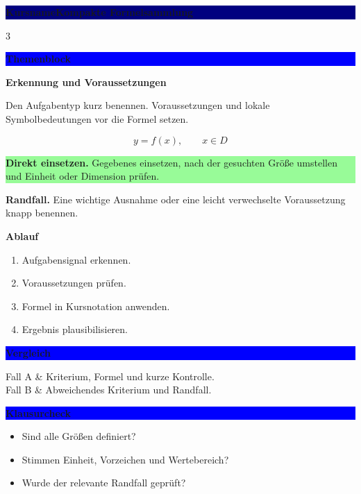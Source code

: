 \documentclass[10pt,a4paper]{article}
\makeatletter
\newcommand{\CourseName}{Kursname}
\newcommand{\SheetName}{Kompakte Formelsammlung}
\newcommand{\titlebar}{%
  \noindent\colorbox{Navy}{%
    \parbox{\dimexpr\linewidth-2\fboxsep\relax}{%
      \color{white}\bfseries\large \CourseName\hfill\normalsize \SheetName}}
  \vspace{2mm}}
\newcommand{\sect}[1]{%
  \vspace{1.5mm}\noindent\colorbox{Blue}{%
    \parbox{\dimexpr\linewidth-2\fboxsep\relax}{\color{white}\bfseries #1}}%
  \vspace{0.8mm}}
\newcommand{\subsect}[1]{\vspace{0.8mm}\textbf{\color{Navy}#1}\par}
\newcommand{\directbox}[1]{%
  \noindent\colorbox{PaleGreen}{%
    \parbox{\dimexpr\linewidth-2\fboxsep\relax}{%
      \textbf{\color{Green}Direkt einsetzen.} #1}}\par}
\newcommand{\warnbox}[1]{%
  \noindent\colorbox{PaleOrange}{%
    \parbox{\dimexpr\linewidth-2\fboxsep\relax}{%
      \textbf{\color{Orange}Randfall.} #1}}\par}
\newenvironment{cheattable}
  {\renewcommand{\arraystretch}{1.05}\tabularx{\linewidth}{@{}>{\raggedright\arraybackslash\bfseries}p{14mm}>{\raggedright\arraybackslash}X@{}}}
  {\endtabularx}
\makeatother
\begin{document}
\titlebar
\begin{multicols*}{3}

\sect{Themenblock}
\subsect{Erkennung und Voraussetzungen}
Den Aufgabentyp kurz benennen. Voraussetzungen und lokale Symbolbedeutungen vor die Formel setzen.

\[
  y = f(x), \qquad x\in D
\]

\directbox{Gegebenes einsetzen, nach der gesuchten Größe umstellen und Einheit oder Dimension prüfen.}

\warnbox{Eine wichtige Ausnahme oder eine leicht verwechselte Voraussetzung knapp benennen.}

\subsect{Ablauf}
\begin{enumerate}[leftmargin=4mm,itemsep=0pt,topsep=1pt]
  \item Aufgabensignal erkennen.
  \item Voraussetzungen prüfen.
  \item Formel in Kursnotation anwenden.
  \item Ergebnis plausibilisieren.
\end{enumerate}

\sect{Vergleich}
\begin{cheattable}
Fall A & Kriterium, Formel und kurze Kontrolle.\\
Fall B & Abweichendes Kriterium und Randfall.\\
\end{cheattable}

\sect{Klausurcheck}
\begin{itemize}
  \item Sind alle Größen definiert?
  \item Stimmen Einheit, Vorzeichen und Wertebereich?
  \item Wurde der relevante Randfall geprüft?
\end{itemize}

\end{multicols*}
\end{document}
